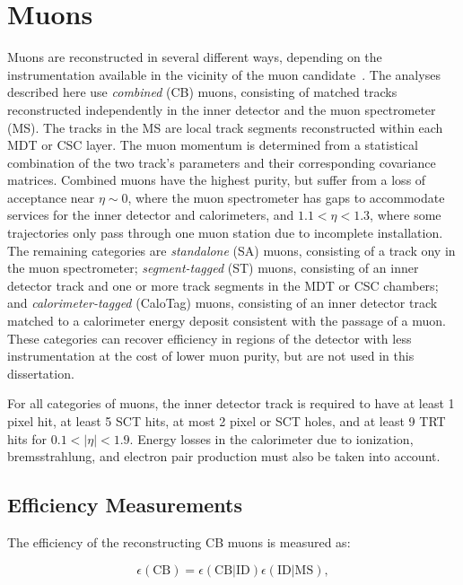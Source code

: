\section{Muons}\label{sec:event-reconstruction-muons}
Muons are reconstructed in several different ways, depending on the instrumentation available in the vicinity of the muon candidate~\cite{TheATLASCollaboration:2014bm}. The analyses described here use \emph{combined} (CB) muons, consisting of matched tracks reconstructed independently in the inner detector and the muon spectrometer (MS). The tracks in the MS are local track segments reconstructed within each MDT or CSC layer. The muon momentum is determined from a statistical combination of the two track's parameters and their corresponding covariance matrices. Combined muons have the highest purity, but suffer from a loss of acceptance near $\eta\sim 0$, where the muon spectrometer has gaps to accommodate services for the inner detector and calorimeters, and $1.1<\eta<1.3$, where some trajectories only pass through one muon station due to incomplete installation. The remaining categories are \emph{standalone} (SA) muons, consisting of a track ony in the muon spectrometer; \emph{segment-tagged} (ST) muons, consisting of an inner detector track and one or more track segments in the MDT or CSC chambers; and \emph{calorimeter-tagged} (CaloTag) muons, consisting of an inner detector track matched to a calorimeter energy deposit consistent with the passage of a muon. These categories can recover efficiency in regions of the detector with less instrumentation at the cost of lower muon purity, but are not used in this dissertation. 

For all categories of muons, the inner detector track is required to have at least 1 pixel hit, at least 5 SCT hits, at most 2 pixel or SCT holes, and at least 9 TRT hits for $0.1<|\eta|<1.9$. Energy losses in the calorimeter due to ionization, bremsstrahlung, and electron pair production must also be taken into account. 

\subsection{Efficiency Measurements}\label{sec:reco-muon-efficiency}
The efficiency of the reconstructing CB muons is measured as:

\begin{equation}
	\epsilon(\mathrm{CB}) = \epsilon(\mathrm{CB}|\mathrm{ID}) \epsilon(\mathrm{ID}|\mathrm{MS}),
\end{equation}

